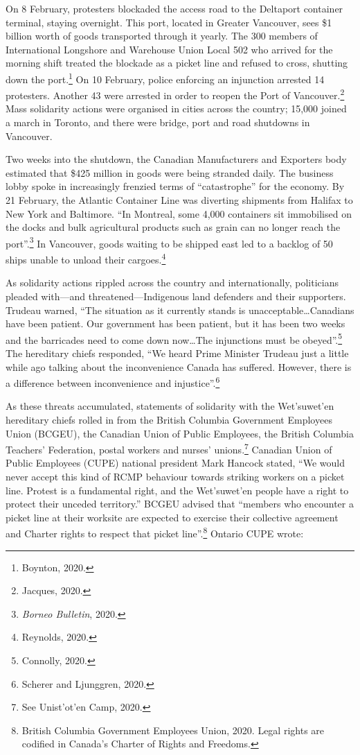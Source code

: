 On 8 February, protesters blockaded the access road to the Deltaport container terminal, staying overnight. This port, located in Greater Vancouver, sees \$1 billion worth of goods transported through it yearly. The 300 members of International Longshore and Warehouse Union Local 502 who arrived for the morning shift treated the blockade as a picket line and refused to cross, shutting down the port.\footnote{Boynton, 2020.} On 10 February, police enforcing an injunction arrested 14 protesters. Another 43 were arrested in order to reopen the Port of Vancouver.\footnote{Jacques, 2020.} Mass solidarity actions were organised in cities across the country; 15,000 joined a march in Toronto, and there were bridge, port and road shutdowns in Vancouver.

Two weeks into the shutdown, the Canadian Manufacturers and Exporters body estimated that \$425 million in goods were being stranded daily. The business lobby spoke in increasingly frenzied terms of ``catastrophe'' for the economy. By 21 February, the Atlantic Container Line was diverting shipments from Halifax to New York and Baltimore. ``In Montreal, some 4,000 containers sit immobilised on the docks and bulk agricultural products such as grain can no longer reach the port''.\footnote{\emph{Borneo Bulletin}, 2020.} In Vancouver, goods waiting to be shipped east led to a backlog of 50 ships unable to unload their cargoes.\footnote{Reynolds, 2020.}

As solidarity actions rippled across the country and internationally, politicians pleaded with---and threatened---Indigenous land defenders and their supporters. Trudeau warned, ``The situation as it currently stands is unacceptable\ldots Canadians have been patient. Our government has been patient, but it has been two weeks and the barricades need to come down now\ldots The injunctions must be obeyed''.\footnote{Connolly, 2020.} The hereditary chiefs responded, ``We heard Prime Minister Trudeau just a little while ago talking about the inconvenience Canada has suffered. However, there is a difference between inconvenience and injustice''.\footnote{Scherer and Ljunggren, 2020.}

As these threats accumulated, statements of solidarity with the Wet'suwet'en hereditary chiefs rolled in from the British Columbia Government Employees Union (BCGEU), the Canadian Union of Public Employees, the British Columbia Teachers' Federation, postal workers and nurses' unions.\footnote{See Unist'ot'en Camp, 2020.} Canadian Union of Public Employees (CUPE) national president Mark Hancock stated, ``We would never accept this kind of RCMP behaviour towards striking workers on a picket line. Protest is a fundamental right, and the Wet'suwet'en people have a right to protect their unceded territory.'' BCGEU advised that ``members who encounter a picket line at their worksite are expected to exercise their collective agreement and Charter rights to respect that picket line''.\footnote{British Columbia Government Employees Union, 2020. Legal rights are codified in Canada's Charter of Rights and Freedoms.} Ontario CUPE wrote:

